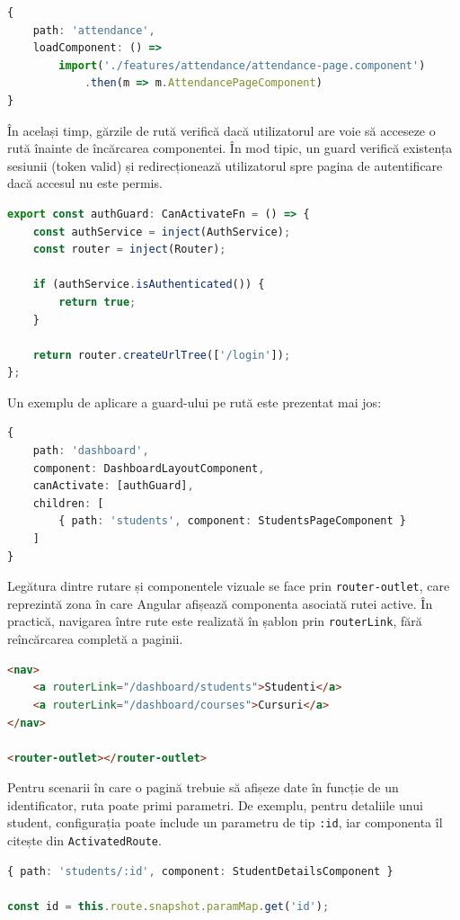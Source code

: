 \begin{lstlisting}[language=TypeScript]
{
	path: 'attendance',
	loadComponent: () =>
		import('./features/attendance/attendance-page.component')
			.then(m => m.AttendancePageComponent)
}
\end{lstlisting}

În același timp, gărzile de rută verifică dacă utilizatorul are voie să acceseze o rută înainte de încărcarea componentei. În mod tipic, un guard verifică existența sesiunii (token valid) și redirecționează utilizatorul spre pagina de autentificare dacă accesul nu este permis.

\begin{lstlisting}[language=TypeScript]
export const authGuard: CanActivateFn = () => {
	const authService = inject(AuthService);
	const router = inject(Router);

	if (authService.isAuthenticated()) {
		return true;
	}

	return router.createUrlTree(['/login']);
};
\end{lstlisting}

Un exemplu de aplicare a guard-ului pe rută este prezentat mai jos:

\begin{lstlisting}[language=TypeScript]
{
	path: 'dashboard',
	component: DashboardLayoutComponent,
	canActivate: [authGuard],
	children: [
		{ path: 'students', component: StudentsPageComponent }
	]
}
\end{lstlisting}

Legătura dintre rutare și componentele vizuale se face prin \texttt{router-outlet}, care reprezintă zona în care Angular afișează componenta asociată rutei active. În practică, navigarea între rute este realizată în șablon prin \texttt{routerLink}, fără reîncărcarea completă a paginii.

\begin{lstlisting}[language=HTML]
<nav>
	<a routerLink="/dashboard/students">Studenti</a>
	<a routerLink="/dashboard/courses">Cursuri</a>
</nav>

<router-outlet></router-outlet>
\end{lstlisting}

Pentru scenarii în care o pagină trebuie să afișeze date în funcție de un identificator, ruta poate primi parametri. De exemplu, pentru detaliile unui student, configurația poate include un parametru de tip \texttt{:id}, iar componenta îl citește din \texttt{ActivatedRoute}.

\begin{lstlisting}[language=TypeScript]
{ path: 'students/:id', component: StudentDetailsComponent }

const id = this.route.snapshot.paramMap.get('id');
\end{lstlisting}


